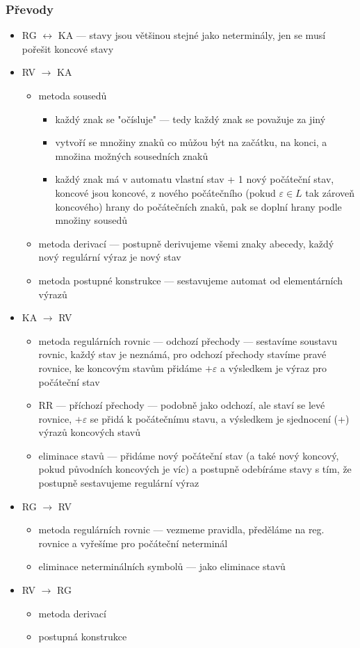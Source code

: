 \subsubsection*{Převody}
\begin{itemize}
	\item RG $\leftrightarrow$ KA --- stavy jsou většinou stejné jako neterminály, jen se musí pořešit koncové stavy
	\item RV $\rightarrow$ KA
	\begin{itemize}
		\item metoda sousedů
		\begin{itemize}
			\item každý znak se "očísluje" --- tedy každý znak se považuje za jiný
			\item vytvoří se množiny znaků co můžou být na začátku, na konci, a množina možných sousedních znaků
			\item každý znak má v automatu vlastní stav + 1 nový počáteční stav, koncové jsou koncové, z nového počátečního (pokud $\varepsilon \in L$ tak zároveň koncového) hrany do počátečních znaků, pak se doplní hrany podle množiny sousedů
		\end{itemize}
		\item metoda derivací --- postupně derivujeme všemi znaky abecedy, každý nový regulární výraz je nový stav
		\item metoda postupné konstrukce --- sestavujeme automat od elementárních výrazů
	\end{itemize}
	\item KA $\rightarrow$ RV
	\begin{itemize}
		\item metoda regulárních rovnic --- odchozí přechody --- sestavíme soustavu rovnic, každý stav je neznámá, pro odchozí přechody stavíme pravé rovnice, ke koncovým stavům přidáme $+\varepsilon$ a výsledkem je výraz pro počáteční stav
		\item RR --- příchozí přechody --- podobně jako odchozí, ale staví se levé rovnice, $+\varepsilon$ se přidá k počátečnímu stavu, a výsledkem je sjednocení (+) výrazů koncových stavů
		\item eliminace stavů --- přidáme nový počáteční stav (a také nový koncový, pokud původních koncových je víc) a postupně odebíráme stavy s tím, že postupně sestavujeme regulární výraz
	\end{itemize}
	\item RG $\rightarrow$ RV
	\begin{itemize}
		\item metoda regulárních rovnic --- vezmeme pravidla, předěláme na reg. rovnice a vyřešíme pro počáteční neterminál
		\item eliminace neterminálních symbolů --- jako eliminace stavů
	\end{itemize}
	\item RV $\rightarrow$ RG
	\begin{itemize}
		\item metoda derivací
		\item postupná konstrukce
	\end{itemize}
\end{itemize}

